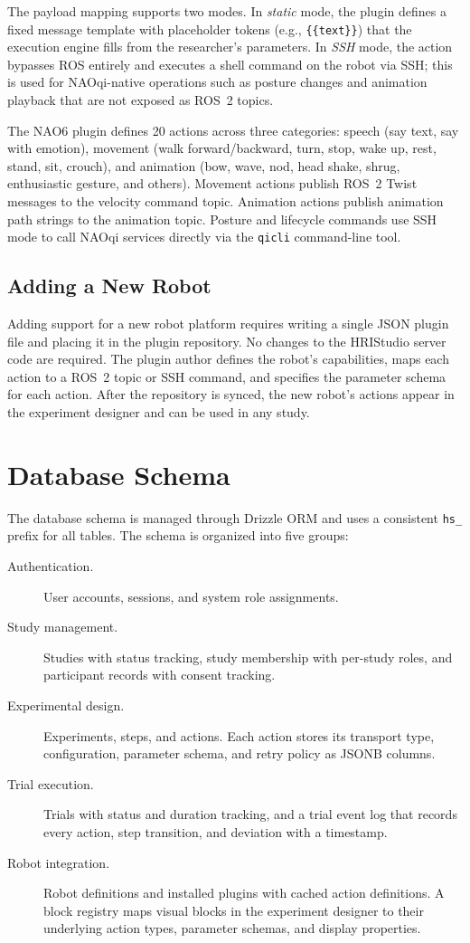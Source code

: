 The payload mapping supports two modes. In \emph{static} mode, the plugin defines a fixed message template with placeholder tokens (e.g., \texttt{\{\{text\}\}}) that the execution engine fills from the researcher's parameters. In \emph{SSH} mode, the action bypasses ROS entirely and executes a shell command on the robot via SSH; this is used for NAOqi-native operations such as posture changes and animation playback that are not exposed as ROS~2 topics.

The NAO6 plugin defines 20 actions across three categories: speech (say text, say with emotion), movement (walk forward/backward, turn, stop, wake up, rest, stand, sit, crouch), and animation (bow, wave, nod, head shake, shrug, enthusiastic gesture, and others). Movement actions publish ROS~2 Twist messages to the velocity command topic. Animation actions publish animation path strings to the animation topic. Posture and lifecycle commands use SSH mode to call NAOqi services directly via the \texttt{qicli} command-line tool.

\subsection{Adding a New Robot}

Adding support for a new robot platform requires writing a single JSON plugin file and placing it in the plugin repository. No changes to the HRIStudio server code are required. The plugin author defines the robot's capabilities, maps each action to a ROS~2 topic or SSH command, and specifies the parameter schema for each action. After the repository is synced, the new robot's actions appear in the experiment designer and can be used in any study.

\section{Database Schema}

The database schema is managed through Drizzle ORM and uses a consistent \texttt{hs\_} prefix for all tables. The schema is organized into five groups:

\begin{description}
\item[Authentication.] User accounts, sessions, and system role assignments.
\item[Study management.] Studies with status tracking, study membership with per-study roles, and participant records with consent tracking.
\item[Experimental design.] Experiments, steps, and actions. Each action stores its transport type, configuration, parameter schema, and retry policy as JSONB columns.
\item[Trial execution.] Trials with status and duration tracking, and a trial event log that records every action, step transition, and deviation with a timestamp.
\item[Robot integration.] Robot definitions and installed plugins with cached action definitions. A block registry maps visual blocks in the experiment designer to their underlying action types, parameter schemas, and display properties.
\end{description}

